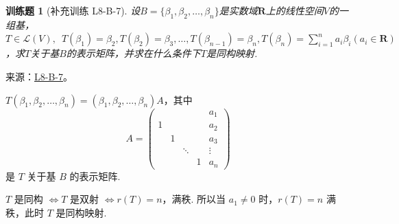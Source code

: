 \documentclass[UTF8,12pt,a4paper,fontset=fandol]{ctexart}
\newtheorem{exercise}{训练题}[section]
\begin{document}
\begin{exercise}[补充训练 L8-B-7]\label{prob:L8-B-7}
设$B=\{\beta_1,\beta_2,\ldots,\beta_n\}$是实数域$\mathbf{R}$上的线性空间$V$的一组基，$T \in \mathcal{L}(V),\enspace T(\beta_1)=\beta_2,T(\beta_2)=\beta_3,\ldots,T(\beta_{n-1}) = \beta_n,T(\beta_n)=\displaystyle\sum_{i=1}^{n}a_i\beta_i(a_i \in \mathbf{R})$，求$T$关于基$B$的表示矩阵，并求在什么条件下$T$是同构映射.
\end{exercise}
\noindent 来源：\href{https://github.com/yhwu-is/Linear-Algebra-Left-Undone/blob/new/%E8%AE%B2%E4%B9%89/%E4%B8%93%E9%A2%98/8%20%E7%9B%B8%E6%8A%B5%E6%A0%87%E5%87%86%E5%BD%A2.tex}{L8-B-7}。
\begin{solve}
$ T(\beta_1, \beta_2, \ldots, \beta_n) = (\beta_1, \beta_2, \ldots, \beta_n)A $，其中
            \[ A = \begin{pmatrix}
                      &   &        &   & a_1    \\
                    1 &   &        &   & a_2    \\
                      & 1 &        &   & a_3    \\
                      &   & \ddots &   & \vdots \\
                      &   &        & 1 & a_n
                \end{pmatrix} \]
            是 $ T $ 关于基 $ B $ 的表示矩阵.

            $ T $ 是同构 $ \iff T $ 是双射 $ \iff r(T) = n $，满秩. 所以当 $ a_1 \neq 0 $ 时，$ r(T) = n $ 满秩，此时 $ T $ 是同构映射.
\end{solve}
\end{document}
